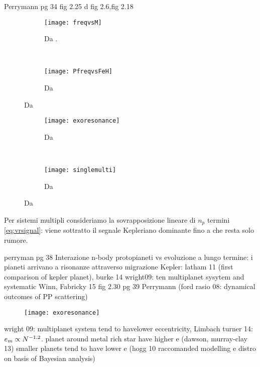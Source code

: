 \begin{workout}
Perrymann pg 34 fig 2.25 d
fig 2.6,fig 2.18
\end{workout}

\begin{figure}[!ht]
\begin{subfigure}[b]{0.47\textwidth}
\texttt{[image: freqvsM]}
\caption{Da \cite{mayor2011harps}.}\label{fig:Mdistro}
\end{subfigure}
~
\begin{subfigure}[b]{0.47\textwidth}
\texttt{[image: PfreqvsFeH]}\label{fig:freqZstar}
\caption{Da \cite{mayor2011harps}}
\end{subfigure}
\end{figure}

\begin{figure}[!ht]
\begin{subfigure}[b]{0.47\textwidth}
\centering
\texttt{[image: exoresonance]}
\caption{Da \cite{winnfabrycky15}}\label{fig:exoresonance}
\end{subfigure}
~
\begin{subfigure}[b]{0.47\textwidth}
\centering
\texttt{[image: singlemulti]}\label{fig:}
\caption{Da \cite{wright09}}
\end{subfigure}
\end{figure}

Per sistemi multipli consideriamo la sovrapposizione lineare di $n_p$ termini \eqref{eq:vrsignal}: viene sottratto il segnale Kepleriano dominante fino a che resta solo rumore.

\begin{workout}
perryman pg 38
Interazione n-body protopianeti vs evoluzione a lungo termine: i pianeti arrivano a risonanze attraverso migrazione
Kepler: latham 11 (first comparison of kepler planet), burke 14
wright09: ten multiplanet sysytem and systematic
Winn, Fabricky 15
fig 2.30 pg 39 Perrymann
(ford rasio 08: dynamical outcomes of PP scattering)
\begin{figure}[!ht]\texttt{[image: exoresonance]}\end{figure}

\end{workout}

\begin{workout}
wright 09: multiplanet system tend to havelower eccentricity,
Limbach turner 14: $e_m\propto N^{-1.2}$.
planet around metal rich star have higher e (dawson, murray-clay 13)
smaller planets tend to have lower e (hogg 10 raccomanded modelling e distro on basis of Bayesian analysis)
\end{workout}


